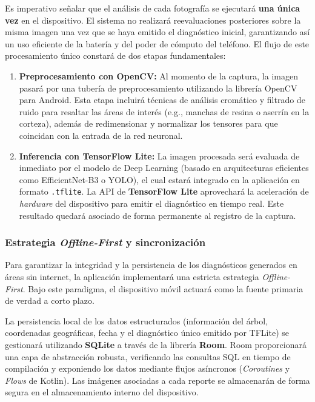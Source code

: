 Es imperativo señalar que el análisis de cada fotografía se ejecutará \textbf{una única vez} en el dispositivo. El sistema no realizará reevaluaciones posteriores sobre la misma imagen una vez que se haya emitido el diagnóstico inicial, garantizando así un uso eficiente de la batería y del poder de cómputo del teléfono. El flujo de este procesamiento único constará de dos etapas fundamentales:

\begin{enumerate}
    \item \textbf{Preprocesamiento con OpenCV:} Al momento de la captura, la imagen pasará por una tubería de preprocesamiento utilizando la librería OpenCV para Android. Esta etapa incluirá técnicas de análisis cromático y filtrado de ruido para resaltar las áreas de interés (e.g., manchas de resina o aserrín en la corteza), además de redimensionar y normalizar los tensores para que coincidan con la entrada de la red neuronal.
    \item \textbf{Inferencia con TensorFlow Lite:} La imagen procesada será evaluada de inmediato por el modelo de Deep Learning (basado en arquitecturas eficientes como EfficientNet-B3 o YOLO), el cual estará integrado en la aplicación en formato \texttt{.tflite}. La API de \textbf{TensorFlow Lite} aprovechará la aceleración de \textit{hardware} del dispositivo para emitir el diagnóstico en tiempo real. Este resultado quedará asociado de forma permanente al registro de la captura.
\end{enumerate}


\subsubsection{Estrategia \textit{Offline-First} y sincronización}

Para garantizar la integridad y la persistencia de los diagnósticos generados en áreas sin internet, la aplicación implementará una estricta estrategia \textit{Offline-First}. Bajo este paradigma, el dispositivo móvil actuará como la fuente primaria de verdad a corto plazo.

La persistencia local de los datos estructurados (información del árbol, coordenadas geográficas, fecha y el diagnóstico único emitido por TFLite) se gestionará utilizando \textbf{SQLite} a través de la librería \textbf{Room}. Room proporcionará una capa de abstracción robusta, verificando las consultas SQL en tiempo de compilación y exponiendo los datos mediante flujos asíncronos (\textit{Coroutines} y \textit{Flows} de Kotlin). Las imágenes asociadas a cada reporte se almacenarán de forma segura en el almacenamiento interno del dispositivo.

